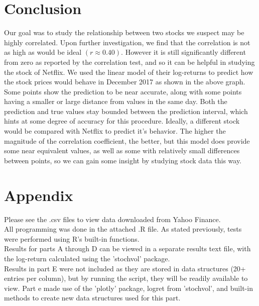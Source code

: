 \documentclass[12pt]{article}
\begin{document}
\section*{Conclusion}
Our goal was to study the relationship between two stocks we suspect may be highly correlated. Upon further investigation, we find that the correlation is not as high as would be ideal $(r\approx0.40)$. However it is still significantly different from zero as reported by the correlation test, and so it can be helpful in studying the stock of Netflix. We used the linear model of their log-returns to predict how the stock prices would behave in December 2017 as shown in the above graph. Some points show the prediction to be near accurate, along with some points having a smaller or large distance from values in the same day. Both the prediction and true values stay bounded between the prediction interval, which hints at some degree of accuracy for this procedure. Ideally, a different stock would be compared with Netflix to predict it's behavior. The higher the magnitude of the correlation coefficient, the better, but this model does provide some near equivalent values, as well as some with relatively small differences between points, so we can gain some insight by studying stock data this way. 

\section*{Appendix}
Please see the .csv files to view data downloaded from Yahoo Finance.
\\All programming was done in the attached .R file. As stated previously, tests were performed using R's built-in functions. 
\\Results for parts A through D can be viewed in a separate results text file, with the log-return calculated using the 'stochvol' package. 
\\Results in part E were not included as they are stored in data structures (20+ entries per column), but by running the script, they will be readily available to view. Part e made use of the 'plotly' package, logret from 'stochvol', and built-in methods to create new data structures used for this part. 
\end{document}
